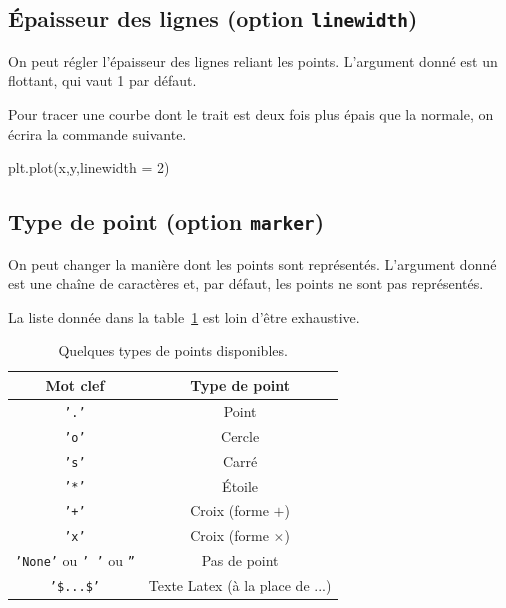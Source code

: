 \subsection{Épaisseur des lignes (option \texttt{linewidth})}

On peut régler l'épaisseur des lignes reliant les points.
L'argument donné est un flottant, qui vaut 1 par défaut. 

\begin{exemple}
  Pour tracer une courbe dont le trait est deux fois plus épais que la normale, on écrira la commande suivante.
\begin{pyverbatim}
plt.plot(x,y,linewidth = 2)
\end{pyverbatim}
\end{exemple}

\subsection{Type de point (option \texttt{marker})}

On peut changer la manière dont les points sont représentés. 
L'argument donné est une chaîne de caractères et, par défaut, les points ne sont pas représentés. 

\begin{rem}
  La liste donnée dans la table~\ref{tab:marker} est loin d'être exhaustive. 
\end{rem}


\begin{table}[!h]
  \begin{center}
    \begin{tabular}{|c|c|}
      \hline
      Mot clef & Type de point \\
      \hline
      \texttt{'.'} & Point \\
      \hline
      \texttt{'o'} & Cercle \\
      \hline
      \texttt{'s'} & Carré \\
      \hline
      \texttt{'*'} & Étoile \\
      \hline
      \texttt{'+'} & Croix (forme $+$) \\
      \hline
      \texttt{'x'} & Croix (forme $\times$) \\
      \hline
      \texttt{'None'} ou \texttt{' '} ou \texttt{''} & Pas de point \\
      \hline
      \texttt{'\$...\$'} & Texte Latex (à la place de ...) \\
      \hline
    \end{tabular}
    \caption{Quelques types de points disponibles.}
    \label{tab:marker}
  \end{center}
\end{table}

